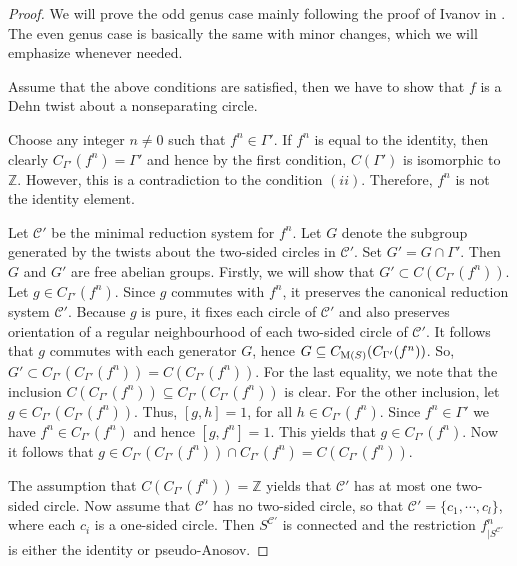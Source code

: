 \documentclass[11 pt]{amsart}
\theoremstyle{definition}
\begin{document}
\begin{proof}
We will prove the odd genus case mainly following the proof of
Ivanov in \cite{I1}. The even genus case is basically the same with
minor changes, which we will emphasize whenever needed.

Assume that the above conditions are satisfied, then we have to show
that $f$ is a Dehn twist about a nonseparating circle.

Choose any integer $n\neq 0$ such that $f^{n}\in \Gamma'$. If
$f^{n}$ is equal to the identity, then clearly $C_{\Gamma'}(f^{n}) =
\Gamma'$ and hence by the first condition, $C(\Gamma')$ is
isomorphic to $\mathbb{Z}$. However, this is a contradiction to the
condition $(ii)$. Therefore, $f^{n}$ is not the identity element.

Let $\mathcal{C'}$ be the minimal reduction system for $f^n$. Let
$G$ denote the subgroup generated by the twists about the two-sided
circles in $\mathcal{C'}$. Set $G' = G \cap \Gamma'$. Then $G$ and
$G'$ are free abelian groups. Firstly, we will show that $G' \subset
C(C_{\Gamma'}(f^{n}))$. Let $g \in C_{\Gamma'}(f^{n})$. Since $g$
commutes with  $f^{n}$, it preserves the canonical reduction system
$\mathcal{C'}$. Because $g$ is pure, it fixes each circle of
$\mathcal{C'}$ and also preserves orientation of a regular
neighbourhood of each two-sided circle of $\mathcal{C'}$. It follows
that $g$ commutes with each generator $G$, hence $G \subseteq
C_{{\rm M} (S)}(C_{\Gamma'}(f^{n}))$. So, $G' \subset
C_{\Gamma'}(C_{\Gamma'}(f^{n}))= C(C_{\Gamma'}(f^{n}))$. For the
last equality, we note that the inclusion
$C(C_{\Gamma'}(f^{n}))\subseteq C_{\Gamma'}(C_{\Gamma'}(f^{n}))$ is
clear. For the other inclusion, let $g \in
C_{\Gamma'}(C_{\Gamma'}(f^{n}))$.  Thus, $[g,h]=1$, for all $h \in
C_{\Gamma'}(f^{n})$.  Since $f^{n} \in \Gamma'$ we have $f^n \in
C_{\Gamma'}(f^{n})$ and hence $[g,f^n]=1$. This yields that $g \in
C_{\Gamma'}(f^{n})$. Now it follows that $g \in
C_{\Gamma'}(C_{\Gamma'}(f^{n})) \cap
C_{\Gamma'}(f^{n})=C(C_{\Gamma'}(f^{n}))$.

The assumption that $C(C_{\Gamma'}(f^{n}))=\mathbb{Z}$ yields that
$\mathcal{C'}$ has at most one two-sided circle. Now assume that
$\mathcal{C'}$ has no two-sided circle, so that $\mathcal{C'} =
\{c_{1}, \cdots, c_{l} \}$, where each $c_{i}$ is a one-sided
circle. Then $S^{\mathcal{C'}}$ is connected and the restriction
$f^{n}_{\mid S^{\mathcal{C'}}}$ is either the identity or
pseudo-Anosov.


\end{proof}
\end{document}
